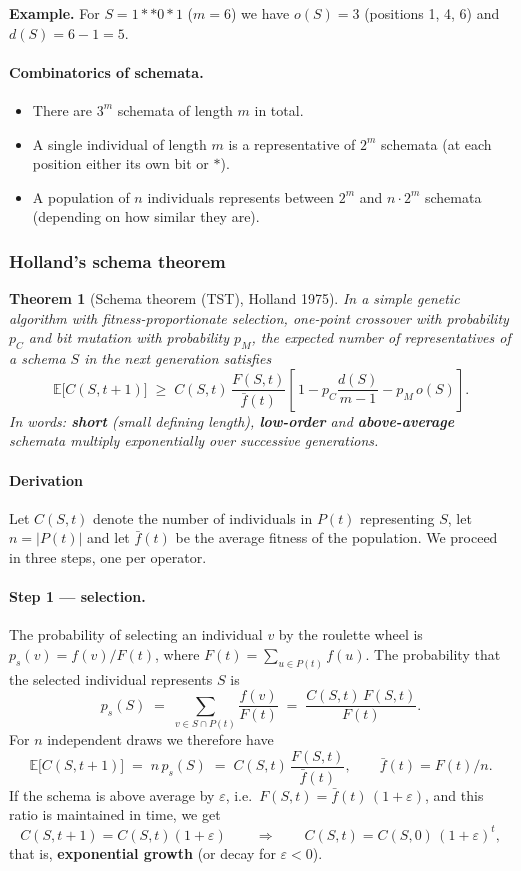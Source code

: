\documentclass[11pt,a4paper]{article}
\newtheorem{theorem}{Theorem}[section]
\theoremstyle{definition}
\begin{document}
\textbf{Example.} For $S = 1{*}{*}0{*}1$ ($m=6$) we have $o(S) = 3$
(positions 1, 4, 6) and $d(S) = 6 - 1 = 5$.

\paragraph{Combinatorics of schemata.}
\begin{itemize}
\item There are $3^m$ schemata of length $m$ in total.
\item A single individual of length $m$ is a representative of $2^m$ schemata
  (at each position either its own bit or $*$).
\item A population of $n$ individuals represents between $2^m$ and
  $n \cdot 2^m$ schemata (depending on how similar they are).
\end{itemize}

\subsubsection{Holland's schema theorem}

\begin{theorem}[Schema theorem (TST), Holland 1975]
In a simple genetic algorithm with fitness-proportionate selection, one-point
crossover with probability $p_C$ and bit mutation with probability $p_M$, the
expected number of representatives of a schema $S$ in the next generation
satisfies
\[
\mathbb{E}\big[C(S,t+1)\big] \;\ge\; C(S,t)\,\frac{F(S,t)}{\bar f(t)}
\left[\,1 - p_C \frac{d(S)}{m-1} - p_M\, o(S)\right].
\]
In words: \textbf{short} (small defining length), \textbf{low-order} and
\textbf{above-average} schemata multiply exponentially over successive
generations.
\end{theorem}

\paragraph{Derivation}

Let $C(S,t)$ denote the number of individuals in $P(t)$ representing $S$, let
$n = |P(t)|$ and let $\bar f(t)$ be the average fitness of the population. We
proceed in three steps, one per operator.

\paragraph{Step 1 --- selection.} The probability of selecting an individual $v$
by the roulette wheel is $p_s(v) = f(v)/F(t)$, where
$F(t) = \sum_{u \in P(t)} f(u)$. The probability that the selected individual
represents $S$ is
\[
p_s(S) \;=\; \sum_{v \in S \cap P(t)} \frac{f(v)}{F(t)}
\;=\; \frac{C(S,t)\,F(S,t)}{F(t)}.
\]
For $n$ independent draws we therefore have
\[
\mathbb{E}\big[C(S,t+1)\big] \;=\; n\, p_s(S) \;=\; C(S,t)\,\frac{F(S,t)}{\bar f(t)},
\qquad \bar f(t) = F(t)/n .
\]
If the schema is above average by $\varepsilon$, i.e.\
$F(S,t) = \bar f(t)\,(1+\varepsilon)$, and this ratio is maintained in time, we
get
\[
C(S,t+1) = C(S,t)(1+\varepsilon)
\qquad\Longrightarrow\qquad
C(S,t) = C(S,0)\,(1+\varepsilon)^{t},
\]
that is, \textbf{exponential growth} (or decay for $\varepsilon<0$).
\end{document}
